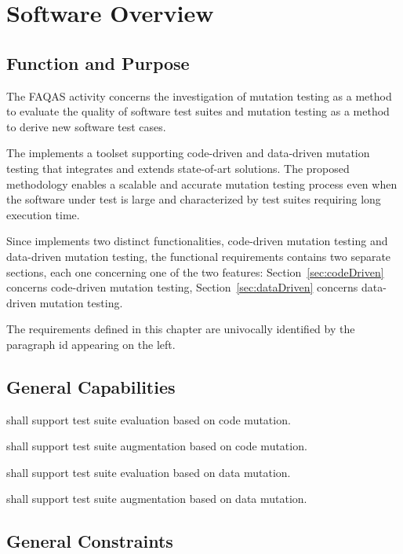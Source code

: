 
\chapter{Software Overview}
\label{chapter:overview}

\section{Function and Purpose}

The FAQAS activity concerns the investigation of mutation testing as a method to evaluate the quality of software test suites and mutation testing as a method to derive new software test cases. 

The \FAQAS implements a toolset supporting code-driven and data-driven mutation testing that integrates and extends state-of-art solutions. The proposed methodology enables a scalable and accurate mutation testing process even when the software under test is large and characterized by test suites requiring long execution time.

Since \FAQAS implements two distinct functionalities, code-driven mutation testing and data-driven mutation testing, the functional requirements contains two separate sections, each one concerning one of the two features: Section~\ref{sec:codeDriven} concerns code-driven mutation testing, Section~\ref{sec:dataDriven} concerns data-driven mutation testing.

The requirements defined in this chapter are univocally identified by the paragraph id appearing on the left.

\section{General Capabilities}

\RQ{} \FAQAS shall support test suite evaluation based on code mutation.

\RQ{} \FAQAS shall support test suite augmentation based on code mutation.

\RQ{} \FAQAS shall support test suite evaluation based on data mutation.

\RQ{} \FAQAS shall support test suite augmentation based on data mutation.


\section{General Constraints}

